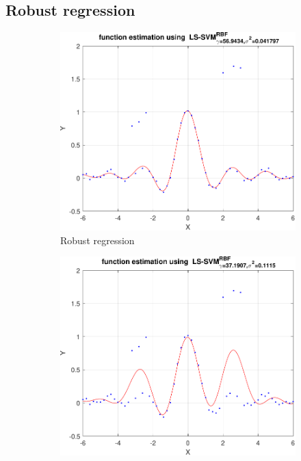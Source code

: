 \documentclass{article}
\begin{document}
            
    \subsection{Robust regression}
        \begin{figure}[h]
             \centering
             \hspace{0.05\textwidth}
             \begin{subfigure}[b]{0.4\textwidth}
                 \centering
                 \includegraphics[width=\textwidth]{Assignment 2/figures/1_4/robust_mae_whuber.pdf}
                 \caption{Robust regression}
                 \label{fig:robust_regression}
             \end{subfigure}
             \hfill
             \begin{subfigure}[b]{0.4\textwidth}
                 \centering
                 \includegraphics[width=\textwidth]{Assignment 2/figures/1_4/standard_mse.pdf}

\end{subfigure}
\end{figure}
\end{document}
